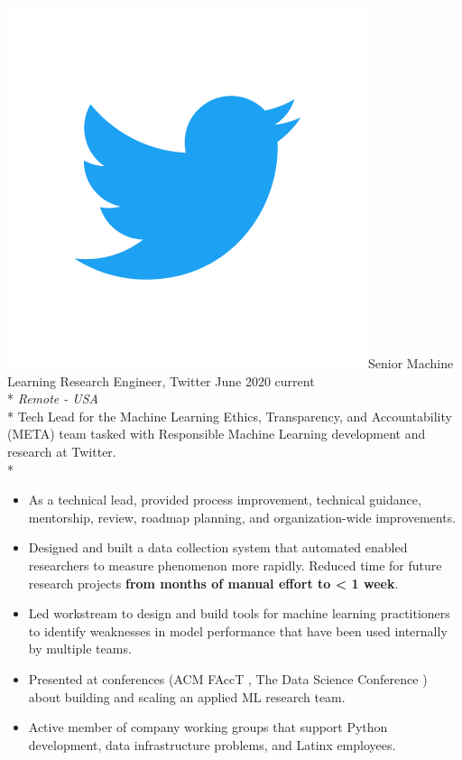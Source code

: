 \documentclass[print]{friggeri-cv} %
\newcommand{\twittericon}{\includegraphics[scale=0.05]{Twitter_Logo_Blue.png}}%
\begin{document}
\begin{description} \itemsep1pt \parskip0pt 
  \item \twittericon {\largeheaderfont Senior Machine Learning Research Engineer, Twitter}
    \hfill {\smallheaderfont June 2020 \textemdash current}\\*
    {\footnotesize \emph{Remote - USA}}\\*
      Tech Lead for the Machine Learning Ethics, Transparency, and Accountability
      (META) team tasked with Responsible Machine Learning development and
      research at Twitter.\\*
      \begin{itemize} \itemsep0.5pt \parskip0pt 

        \item As a technical lead, provided process improvement, technical guidance,
        mentorship, review, roadmap planning, and organization-wide improvements. 
        
        \item Designed and built a data collection system that
        automated enabled researchers to measure phenomenon more rapidly. Reduced time
        for future research projects \textbf{from months of manual effort to < 1 week}.
        
        \item Led workstream to design and build tools for machine learning
        practitioners to identify weaknesses in model performance that have been
        used internally by multiple teams.
        
        \item Presented at conferences (ACM FAccT \cite{facct_2022_talk}, The Data Science Conference \cite{datascience_2022_talk})
        about building and scaling an applied ML research team.
        
        \item Active member of company working groups that support Python development, data
        infrastructure problems, and Latinx employees.
      \end{itemize}
  \end{description}
\end{document}
